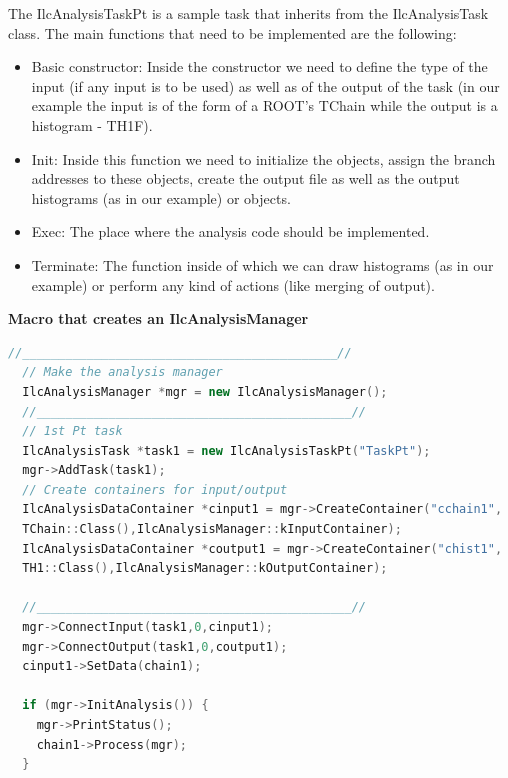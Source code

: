 The {\ttfamily IlcAnalysisTaskPt} is a sample task that inherits from the {\ttfamily IlcAnalysisTask} class. The main functions that need to be implemented are the following:

\begin{itemize}
\item Basic constructor: Inside the constructor we need to define the type of the input (if any input is to be used) as well as of the output of the task (in our example the input is of the form of a ROOT's {\ttfamily TChain} while the output is a histogram - {\ttfamily TH1F}).
\item {\ttfamily Init:} Inside this function we need to initialize the objects, assign the branch addresses to these objects, create the output file as well as the output histograms (as in our example) or objects.
\item {\ttfamily Exec:} The place where the analysis code should be implemented.
\item {\ttfamily Terminate:} The function inside of which we can draw histograms (as in our example) or perform any kind of actions (like merging of output).
\end{itemize}

\vspace{0.5 cm}
\textbf{Macro that creates an IlcAnalysisManager}
\begin{lstlisting}[language=C++]
  //____________________________________________//
  // Make the analysis manager
  IlcAnalysisManager *mgr = new IlcAnalysisManager();
  //____________________________________________//
  // 1st Pt task
  IlcAnalysisTask *task1 = new IlcAnalysisTaskPt("TaskPt");
  mgr->AddTask(task1);
  // Create containers for input/output
  IlcAnalysisDataContainer *cinput1 = mgr->CreateContainer("cchain1",
  TChain::Class(),IlcAnalysisManager::kInputContainer);
  IlcAnalysisDataContainer *coutput1 = mgr->CreateContainer("chist1", 
  TH1::Class(),IlcAnalysisManager::kOutputContainer);
  
  //____________________________________________//
  mgr->ConnectInput(task1,0,cinput1);
  mgr->ConnectOutput(task1,0,coutput1);
  cinput1->SetData(chain1);
  
  if (mgr->InitAnalysis()) {
    mgr->PrintStatus();
    chain1->Process(mgr);
  }
\end{lstlisting}

